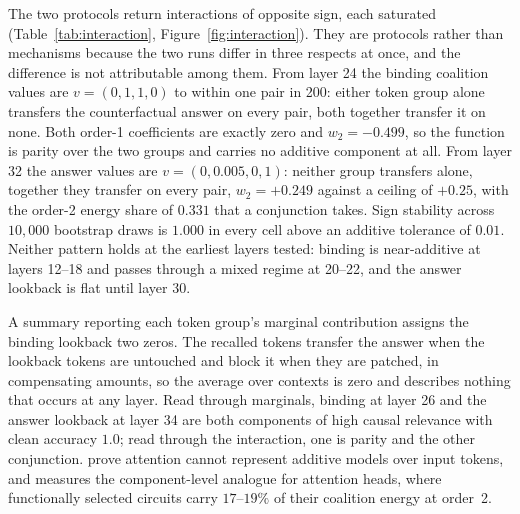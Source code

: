 \documentclass{article}
\begin{document}
The two protocols return interactions of opposite sign, each saturated (Table~\ref{tab:interaction},
Figure~\ref{fig:interaction}). They are protocols rather than mechanisms because the two runs
differ in three respects at once, and the difference is not attributable among them. From layer 24 the binding coalition values are
$v = (0, 1, 1, 0)$ to within one pair in 200: either token group alone transfers the
counterfactual answer on every pair, both together transfer it on none. Both order-1
coefficients are exactly zero and $w_2 = -0.499$, so the function is parity over the two
groups and carries no additive component at all. From layer 32 the answer values are
$v = (0, 0.005, 0, 1)$: neither group transfers alone, together they transfer on every pair,
$w_2 = +0.249$ against a ceiling of $+0.25$, with the order-2 energy share of $0.331$ that a
conjunction takes. Sign stability across $10{,}000$ bootstrap draws is $1.000$ in every cell
above an additive tolerance of $0.01$. Neither pattern holds at the earliest layers tested:
binding is near-additive at layers 12--18 and passes through a mixed regime at 20--22, and the
answer lookback is flat until layer 30.

A summary reporting each token group's marginal contribution assigns the binding lookback two
zeros. The recalled tokens transfer the answer when the lookback tokens are untouched and
block it when they are patched, in compensating amounts, so the average over contexts is zero
and describes nothing that occurs at any layer. Read through marginals, binding at layer 26
and the answer lookback at layer 34 are both components of high causal relevance with clean
accuracy $1.0$; read through the interaction, one is parity and the other conjunction.
\citet{leemann2024slalom} prove attention cannot represent additive models over input tokens,
and \citet{tower2026epistatic} measures the component-level analogue for attention heads,
where functionally selected circuits carry $17$--$19\%$ of their coalition energy at order~2.
\end{document}
